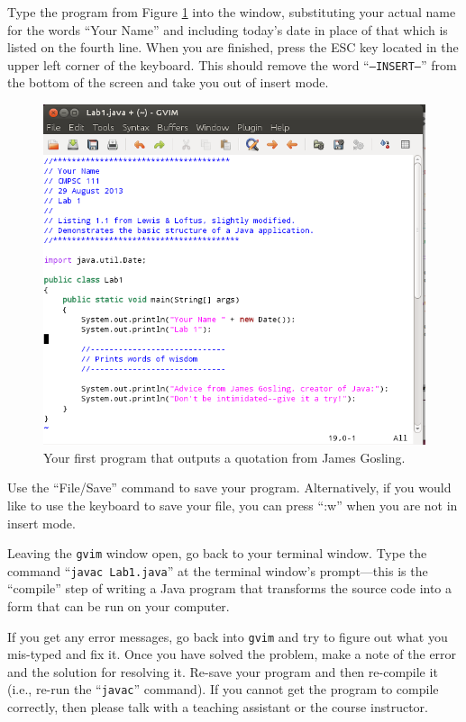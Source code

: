 Type the program from Figure \ref{lab1prog} into the window, substituting your actual name for the words ``Your Name''
and including today's date in place of that which is listed on the fourth line. When you are finished, press the ESC
key located in the upper left corner of the keyboard.  This should remove the word ``{\tt --INSERT--}'' from the bottom
of the screen and take you out of insert mode.

\begin{figure}[tbp]
  \centering
  \includegraphics[width=5.8in]{images/lab1prog}
  \caption{Your first program that outputs a quotation from James Gosling.}
  \label{lab1prog}
\end{figure}

Use the ``File/Save'' command to save your program. Alternatively, if you would like to use the keyboard to save your
file, you can press ``:w'' when you are not in insert mode.

Leaving the {\tt gvim} window open, go back to your terminal window. Type the command ``{\tt javac Lab1.java}'' at the
terminal window's prompt---this is the ``compile'' step of writing a Java program that transforms the source code into a
form that can be run on your computer.

If you get any error messages, go back into {\tt gvim} and try to figure out what you mis-typed and fix it. Once you
have solved the problem, make a note of the error and the solution for resolving it. Re-save your program and then
re-compile it (i.e., re-run the ``{\tt javac}'' command). If you cannot get the program to compile correctly, then
please talk with a teaching assistant or the course instructor.

